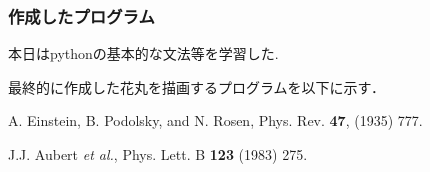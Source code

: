 \documentclass[uplatex,dvipdfmx,a4j,12pt]{jsarticle}
\begin{document}
\subsubsection{作成したプログラム}
本日はpythonの基本的な文法等を学習した.

最終的に作成した花丸を描画するプログラムを以下に示す．



\begin{thebibliography}{9}

        A. Einstein, B. Podolsky, and N. Rosen, 
        Phys. Rev. \textbf{47}, (1935) 777.

        J.J. Aubert \textit{et al.},
        Phys. Lett. B \textbf{123} (1983) 275.
    
\end{thebibliography}
\end{document}
